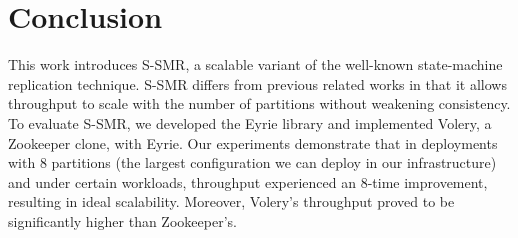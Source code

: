 \section{Conclusion}
\label{sec:conclusion}

This work introduces S-SMR, a scalable variant of the well-known state-machine replication technique. 
S-SMR differs from previous related works in that it allows throughput to scale with the number of partitions without weakening consistency. 
To evaluate S-SMR, we developed the Eyrie library and implemented Volery, a Zookeeper clone, with Eyrie.
Our experiments demonstrate that in deployments with 8 partitions (the largest configuration we can deploy in our infrastructure) and under certain workloads, throughput experienced an 8-time improvement, resulting in ideal scalability.
Moreover, Volery's throughput proved to be significantly higher than Zookeeper's.